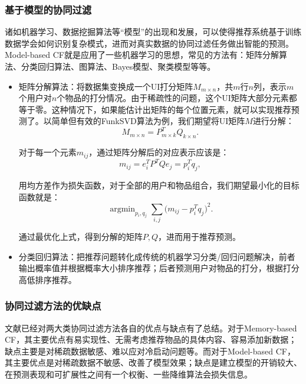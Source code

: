       \subsubsection{基于模型的协同过滤}
      诸如机器学习、数据挖掘算法等“模型”的出现和发展，可以使得推荐系统基于训练数据学会如何识别复杂模式，进而对真实数据的协同过滤任务做出智能的预测。Model-based CF就是应用了一些机器学习的思想，常见的方法有：矩阵分解算法、分类回归算法、图算法、Bayes模型、聚类模型等等\cite{su2009survey}。

      \begin{itemize}
        \item 矩阵分解算法：将数据集变换成一个UI打分矩阵$M_{m\times n}$，共$m$行$n$列，表示$m$个用户对$n$个物品的打分情况。由于稀疏性的问题，这个UI矩阵大部分元素都等于零。这种情况下，如果能估计出矩阵的每个位置元素，就可以实现推荐预测了。以简单但有效的FunkSVD算法\cite{funk2006netflix}为例，我们期望将UI矩阵$M$进行分解：
        \begin{equation}
        M_{m\times n}=P^T_{m\times k}Q_{k\times n}.
        \end{equation}

        对于每一个元素$m_{ij}$，通过矩阵分解后的对应表示应该是：
        \begin{equation}
        m_{ij} = e_i^TP^TQe_j = p_i^Tq_j,
        \end{equation}
      
        用均方差作为损失函数，对于全部的用户和物品组合，我们期望最小化的目标函数就是：
        \begin{equation}
        \mathop{argmin}_{p_i,q_j}\sum_{i,j}\big(m_{ij}-p_i^Tq_j\big)^2.
        \end{equation}

        通过最优化上式，得到分解的矩阵$P,Q$，进而用于推荐预测。

        \item 分类回归算法：把推荐问题转化成传统的机器学习分类/回归问题解决，前者输出概率值并根据概率大小排序推荐；后者预测用户对物品的打分，根据打分高低排序推荐。
      \end{itemize}

      \subsubsection{协同过滤方法的优缺点}
      文献\cite{su2009survey}已经对两大类协同过滤方法各自的优点与缺点有了总结。对于Memory-based CF，其主要优点有易实现性、无需考虑推荐物品的具体内容、容易添加新数据；缺点主要是对稀疏数据敏感、难以应对冷启动问题等。而对于Model-based CF，其主要优点是对稀疏数据不敏感、改善了模型效果；缺点是建立模型的开销较大、在预测表现和可扩展性之间有一个权衡、一些降维算法会损失信息。

